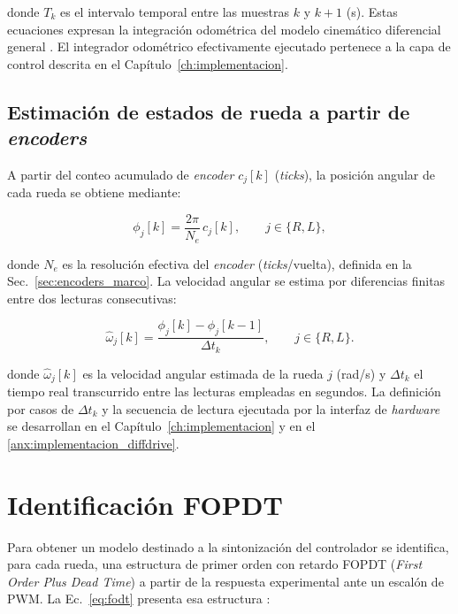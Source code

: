\noindent donde $T_k$ es el intervalo temporal entre las muestras $k$ y
$k+1$ (s). Estas ecuaciones expresan la integración odométrica del modelo
cinemático diferencial general \citep{ferreira2023differential}. El integrador odométrico efectivamente ejecutado pertenece a la
capa de control descrita en el Capítulo~\ref{ch:implementacion}.

\subsection{Estimación de estados de rueda a partir de \texorpdfstring{\textit{encoders}}{encoders}}
\label{sec:estados_rueda}

A partir del conteo acumulado de \textit{encoder} $c_j[k]$ (\textit{ticks}), la posición
angular de cada rueda se obtiene mediante:

\begin{equation}
\phi_j[k]
=
\frac{2\pi}{N_e}\,c_j[k],
\qquad j\in\{R,L\},
\label{eq:posicion_rueda_encoder}
\end{equation}

\noindent donde $N_e$ es la resolución efectiva del \textit{encoder} (\textit{ticks}/vuelta),
definida en la Sec.~\ref{sec:encoders_marco}. La velocidad angular se estima por diferencias finitas entre dos lecturas
consecutivas:

\begin{equation}
\widehat{\omega}_j[k]
=
\frac{\phi_j[k]-\phi_j[k-1]}{\Delta t_k},
\qquad j\in\{R,L\}.
\label{eq:w_ruedas}
\end{equation}

\noindent donde $\widehat{\omega}_j[k]$ es la velocidad angular estimada de
la rueda $j$ (rad/s) y $\Delta t_k$ el tiempo real transcurrido entre las
lecturas empleadas en segundos. La definición por casos de $\Delta t_k$ y la
secuencia de lectura ejecutada por la interfaz de \textit{hardware} se desarrollan en
el Capítulo~\ref{ch:implementacion} y en el
\ref{anx:implementacion_diffdrive}.

\section{Identificación FOPDT}
\label{sec:fodt}

Para obtener un modelo destinado a la sintonización del controlador se
identifica, para cada rueda, una estructura de primer orden con retardo FOPDT
(\textit{First Order Plus Dead Time}) a partir de la respuesta experimental
ante un escalón de \gls{PWM}. La Ec.~\eqref{eq:fodt} presenta esa estructura
\citep{maxim2023fopdt}:

